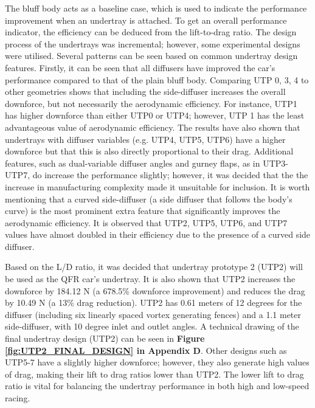 \noindent The bluff body acts as a baseline case, which is used to indicate the performance improvement when an undertray is attached. To get an overall performance indicator, the efficiency can be deduced from the lift-to-drag ratio. The design process of the undertrays was incremental; however, some experimental designs were utilised. Several patterns can be seen based on common undertray design features. Firstly, it can be seen that all diffusers have improved the car's performance compared to that of the plain bluff body. Comparing UTP 0, 3, 4 to other geometries shows that including the side-diffuser increases the overall downforce, but not necessarily the aerodynamic efficiency. For instance, UTP1 has higher downforce than either UTP0 or UTP4; however, UTP 1 has the least advantageous value of aerodynamic efficiency. The results have also shown that undertrays with diffuser variables (e.g. UTP4, UTP5, UTP6) have a higher downforce but that this is also directly proportional to their drag. Additional features, such as dual-variable diffuser angles and gurney flaps, as in UTP3-UTP7, do increase the performance slightly; however, it was decided that the the increase in manufacturing complexity made it unsuitable for inclusion. It is worth mentioning that a curved side-diffuser (a side diffuser that follows the body's curve) is the most prominent extra feature that significantly improves the aerodynamic efficiency. It is observed that UTP2, UTP5, UTP6, and UTP7 values have almost doubled in their efficiency due to the presence of a curved side diffuser.

\noindent Based on the L/D ratio, it was decided that undertray prototype 2 (UTP2) will be used as the QFR car's undertray. It is also shown that UTP2 increases the downforce by 184.12 N (a 678.5\% downforce improvement) and reduces the drag by 10.49 N (a 13\% drag reduction). UTP2 has 0.61 meters of 12 degrees for the diffuser (including six linearly spaced vortex generating fences) and a 1.1 meter side-diffuser, with 10 degree inlet and outlet angles. A technical drawing of the final undertray design (UTP2) can be seen in \textbf{Figure \ref{fig:UTP2_FINAL_DESIGN} in Appendix D}. Other designs such as UTP5-7  have a slightly higher downforce; however, they also generate high values of drag, making their lift to drag ratios lower than UTP2. The lower lift to drag ratio is vital for balancing the undertray performance in both high and low-speed racing.

